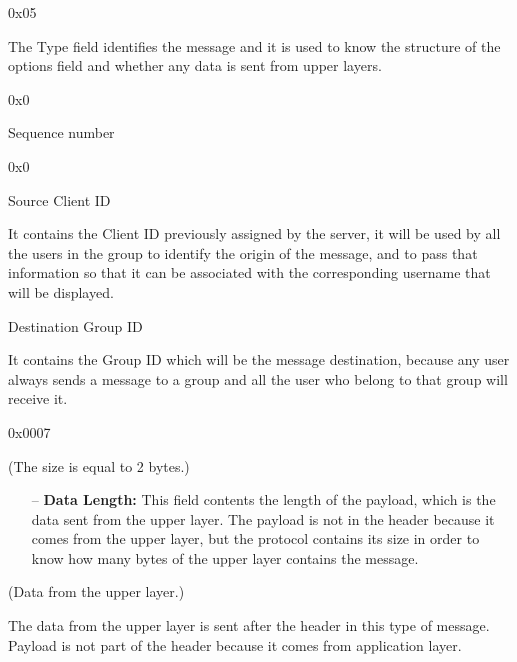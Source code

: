\documentclass{article}
\begin{document}
\begin{description}[align=left]
    \item [Type:] 0x05
    \begin{flushleft}
        The Type field identifies the message and it is used to know the structure of the options field and whether any data is sent from upper layers.
    \end{flushleft}
    
    \item [Reserved:] 0x0
        
    \item [Sequence:] Sequence number
    
    \item [Acknowledgement:] 0x0
    
    \item [Source ID:] Source Client ID
    \begin{flushleft}
        It contains the Client ID previously assigned by the server, it will be used by all the users in the group to identify the origin of the message, and to pass that information so that it can be associated with the corresponding username that will be displayed.
    \end{flushleft}
    
    \item [Group ID:] Destination Group ID
    \begin{flushleft}
        It contains the Group ID which will be the message destination, because any user always sends a message to a group and all the user who belong to that group will receive it.
    \end{flushleft}
    
    \item [Header Length:] 0x0007

    \item[Options:] (The size is equal to 2 bytes.)
    \begin{itemize}
        \item[--]\textbf{Data Length:} This field contents the length of the payload, which is the data sent from the upper layer. The payload is not in the header because it comes from the upper layer, but the protocol contains its size in order to know how many bytes of the upper layer contains the message.
    \end{itemize}
    
    \item[Payload:] (Data from the upper layer.)
    \begin{flushleft}
        The data from the upper layer is sent after the header in this type of message. Payload is not part of the header because it comes from application layer.
    \end{flushleft}
    
\end{description}
\end{document}
